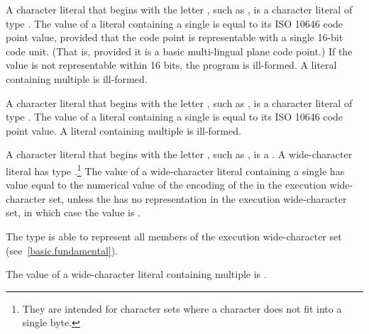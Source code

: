 \pnum
{}%
%
%
A character literal that
begins with the letter , such as ,
%
is a character literal of type . The value
of a  literal containing a single  is
equal to its ISO 10646 code point value, provided that the code point is
representable with a single 16-bit code unit. (That is, provided it is a
basic multi-lingual plane code point.) If the value is not representable
within 16 bits, the program is ill-formed. A  literal
containing multiple  is ill-formed.

\pnum
{}%
%
%
A character literal that
begins with the letter , such as ,
%
is a character literal of type . The value of a
 literal containing a single  is equal
to its ISO 10646 code point value. A  literal containing
multiple  is ill-formed.

\pnum
{}%
%
%
%
A character literal that
begins with the letter , such as ,
%
is a . A wide-character literal has type
.\footnote{They are intended for character sets where a character does
not fit into a single byte. }
The value of a wide-character literal containing a single
 has value equal to the numerical value of the encoding
of the  in the execution wide-character set, unless the
 has no representation in the execution wide-character set, in which
case the value is . \begin{note} The type  is able to
represent all members of the execution wide-character set (see~\ref{basic.fundamental}).
\end{note} The value
of a wide-character literal containing multiple  is
.

